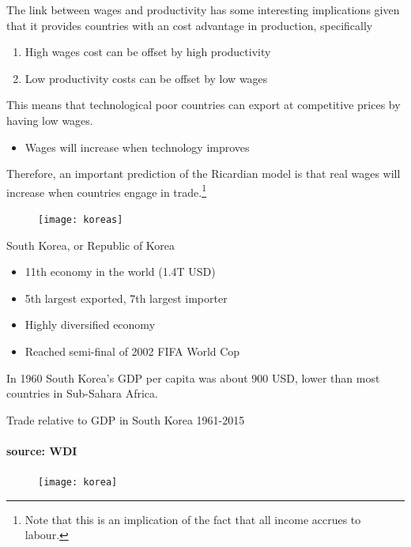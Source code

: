 \documentclass{beamer}
\begin{document}
\begin{frame}
  The link between wages and productivity has some interesting implications given that it provides countries with an cost advantage in production, specifically
  \medskip
  \begin{enumerate}
    \item High wages cost can be offset by high productivity
    \item Low productivity costs can be offset by low wages
  \end{enumerate}
  \medskip
  This means that technological poor countries can export at competitive prices by having low wages.
  \begin{itemize}
    \item Wages will increase when technology improves
  \end{itemize}
  \medskip
  Therefore, an important prediction of the Ricardian model is that real wages will increase when countries engage in trade.\footnote{Note that this is an implication of the fact that all income accrues to labour.}
\end{frame}

\begin{frame}
  \begin{figure}\centering
    \texttt{[image: koreas]}
  \end{figure}
\end{frame}

\begin{frame}
  South Korea, or Republic of Korea
  \begin{itemize}
    \item 11th economy in the world (1.4T USD)
    \item 5th largest exported, 7th largest importer
    \item Highly diversified economy
    \item Reached semi-final of 2002 FIFA World Cop
  \end{itemize}
  \medskip
  In 1960 South Korea's GDP per capita was about 900 USD, lower than most countries in Sub-Sahara Africa.   
\end{frame}

\begin{frame}{Trade relative to GDP in South Korea 1961-2015}
\framesubtitle{source: WDI}
  \begin{figure}
    \texttt{[image: korea]}
  \end{figure}
\end{frame}
\end{document}
